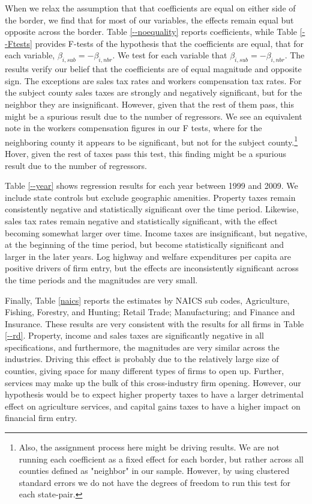 When we relax the assumption that  that coefficients are equal on either side of the border, we find that for most of our variables, the effects remain equal but opposite across the border. Table \ref{--noequality} reports coefficients, while Table \ref{--Ftests} provides F-tests of the hypothesis that the coefficients are equal, that for each variable, $\beta_{i,sub} = - \beta_{i,nbr}$. We test for each variable that $\beta_{i,sub} = - \beta_{i,nbr}$. The results verify our belief that the coefficients are of equal magnitude and opposite sign. The exceptions are sales tax rates and workers compensation tax rates. For the subject county sales taxes are strongly and negatively significant, but for the neighbor they are insignificant. However, given that the rest of them pass, this might be a spurious result due to the number of regressors. We see an equivalent note in the workers compensation figures in our F tests, where for the neighboring county it appears to be significant, but not for the subject county.\footnote{Also, the assignment process here might be driving results. We are not running each coefficient as a fixed effect for each border, but rather across all counties defined as "neighbor" in our sample. However, by using clustered standard errors we do not have the degrees of freedom to run this test for each state-pair.} Hover, given the rest of taxes pass this test, this finding might be a spurious result due to the number of regressors.

Table \ref{--year} shows regression results for each  year between 1999 and 2009. We include state controls but exclude geographic amenities. Property taxes remain consistently negative and statistically significant over the time period. Likewise, sales tax rates remain negative and statistically significant, with the effect becoming somewhat larger over time.  Income taxes are insignificant, but negative, at the beginning of the time period, but  become statistically significant and larger in the later years. Log highway and welfare expenditures per capita are positive drivers of firm entry, but the effects are inconsistently significant across the time periods and the magnitudes are very small.

Finally, Table \ref{naics} reports the estimates by NAICS sub codes,  Agriculture, Fishing, Forestry, and Hunting; Retail Trade; Manufacturing; and Finance and Insurance. These results are very consistent with the results for all firms in Table \ref{--rd}. Property, income and sales taxes are significantly negative in all specifications, and furthermore, the magnitudes are very similar across the industries. Driving this effect is probably due to the relatively large size of counties, giving space for many different types of firms to open up. Further, services may make up the bulk of this cross-industry firm opening. However, our hypothesis would be to expect higher property taxes to have a larger detrimental effect on agriculture services, and capital gains taxes to have a higher impact on financial firm entry.

